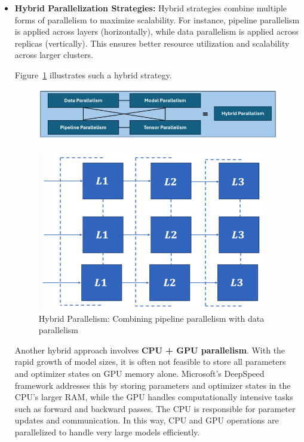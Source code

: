\documentclass[12pt]{book}
\begin{document}
\begin{itemize}
    \item \textbf{Hybrid Parallelization Strategies:}  
    Hybrid strategies combine multiple forms of parallelism to maximize scalability. For instance, pipeline parallelism is applied across layers (horizontally), while data parallelism is applied across replicas (vertically). This ensures better resource utilization and scalability across larger clusters.  

    Figure~\ref{fig:hybd} illustrates such a hybrid strategy.  

    \begin{figure}[ht]
        \centering
        \includegraphics[width=0.75\linewidth]{images/hybdstrag.png}
    \end{figure}

    \begin{figure}[ht]
        \centering
        \includegraphics[width=0.5\linewidth]{images/hybdpstrag.png}
        \caption{Hybrid Parallelism: Combining pipeline parallelism with data parallelism}
        \label{fig:hybd}
    \end{figure}

    Another hybrid approach involves \textbf{CPU + GPU parallelism}. With the rapid growth of model sizes, it is often not feasible to store all parameters and optimizer states on GPU memory alone. Microsoft’s DeepSpeed framework addresses this by storing parameters and optimizer states in the CPU’s larger RAM, while the GPU handles computationally intensive tasks such as forward and backward passes. The CPU is responsible for parameter updates and communication. In this way, CPU and GPU operations are parallelized to handle very large models efficiently.  


\end{itemize}
\end{document}
